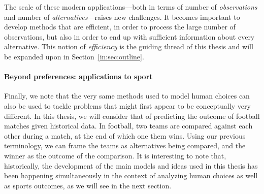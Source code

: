 The scale of these modern applications---both in terms of number of \emph{observations} and number of \emph{alternatives}---raises new challenges.
It becomes important to develop methods that are efficient, in order to process the large number of observations, but also in order to end up with sufficient information about every alternative.
This notion of \emph{efficiency} is the guiding thread of this thesis and will be expanded upon in Section~\ref{in:sec:outline}.

\paragraph{Beyond preferences: applications to sport}
Finally, we note that the very same methods used to model human choices can also be used to tackle problems that might first appear to be conceptually very different.
In this thesis, we will consider that of predicting the outcome of football matches given historical data.
In football, two teams are compared against each other during a match, at the end of which one them wins.
Using our previous terminology, we can frame the teams as alternatives being compared, and the winner as the outcome of the comparison.
It is interesting to note that, historically, the development of the main models and ideas used in this thesis has been happening simultaneously in the context of analyzing human choices as well as sports outcomes, as we will see in the next section.



